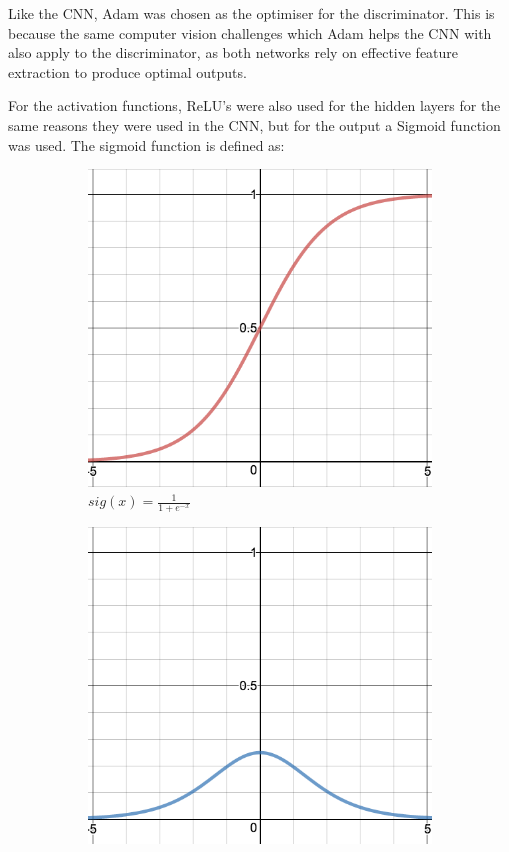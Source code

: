 \documentclass{l4proj}
\begin{document}
Like the CNN, Adam was chosen as the optimiser for the discriminator. This is because the same computer vision challenges which Adam helps the CNN with also apply to the discriminator, as both networks rely on effective feature extraction to produce optimal outputs. 

For the activation functions, ReLU's were also used for the hidden layers for the same reasons they were used in the CNN, but for the output a Sigmoid function was used. The sigmoid function is defined as:
\begin{figure}[H]
    \centering
    \begin{subfigure}[b]{0.4\textwidth}
        \includegraphics[width=\textwidth]{images/sigmoid.png}
        \caption{$sig(x) = \frac{1}{1+e^{-x}}$}
    \end{subfigure}
    \quad
    \begin{subfigure}[b]{0.4\textwidth}
        \includegraphics[width=\textwidth]{images/sigmoid_prime.png}

\end{subfigure}
\end{figure}
\end{document}
